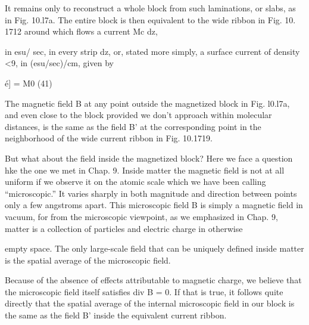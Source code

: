 {It remains only to reconstruct a whole block from such 
laminations, or slabs, as in Fig. 10.l7a. The entire block is then equivalent
to the wide ribbon in Fig. 10. 1712 around which flows a current Mc dz,

in esu/ sec, in every strip dz, or, stated more simply, a surface current
of density <9, in (esu/sec)/cm, given by

é] = M0 (41)

The magnetic field B at any point outside the magnetized block in
Fig. l0.l7a, and even close to the block provided we don't approach
within molecular distances, is the same as the field B' at the corresponding
point in the neighborhood of the wide current ribbon in
Fig. 10.1719.

But what about the field inside the magnetized block? Here we
face a question hke the one we met in Chap. 9. Inside matter the
magnetic field is not at all uniform if we observe it on the atomic
scale which we have been calling ``microscopic.'' It varies sharply
in both magnitude and direction between points only a few angstroms
apart. This microscopic field B is simply a magnetic field in vacuum,
for from the microscopic viewpoint, as we emphasized in Chap. 9,
matter is a collection of particles and electric charge in otherwise

empty space. The only large-scale field that can be uniquely defined
inside matter is the spatial average of the microscopic field.

Because of the absence of effects attributable to magnetic charge,
we believe that the microscopic field itself satisfies div B = 0. If that
is true, it follows quite directly that the spatial average of the internal
microscopic field in our block is the same as the field B' inside the
equivalent current ribbon.

}
